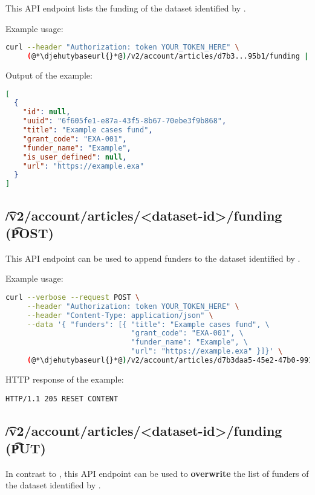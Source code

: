   This API endpoint lists the funding of the dataset identified by .

  Example usage:
\begin{lstlisting}[language=bash]
curl --header "Authorization: token YOUR_TOKEN_HERE" \
     (@*\djehutybaseurl{}*@)/v2/account/articles/d7b3...95b1/funding | jq
\end{lstlisting}

  Output of the example:
\begin{lstlisting}[language=JSON]
[
  {
    "id": null,
    "uuid": "6f605fe1-e87a-43f5-8b67-70ebe3f9b868",
    "title": "Example cases fund",
    "grant_code": "EXA-001",
    "funder_name": "Example",
    "is_user_defined": null,
    "url": "https://example.exa"
  }
]
\end{lstlisting}

\subsection{\t{/v2/account/articles/<dataset-id>/funding} (\t{POST})}
\label{sec:api-v2-articles-funding-post}

  This API endpoint can be used to append funders to the dataset identified
  by \code{dataset-id}.

  Example usage:
\begin{lstlisting}[language=bash]
curl --verbose --request POST \
     --header "Authorization: token YOUR_TOKEN_HERE" \
     --header "Content-Type: application/json" \
     --data '{ "funders": [{ "title": "Example cases fund", \
                             "grant_code": "EXA-001", \
                             "funder_name": "Example", \
                             "url": "https://example.exa" }]}' \
     (@*\djehutybaseurl{}*@)/v2/account/articles/d7b3daa5-45e2-47b0-9910-0f7fa6a995b1/funding
\end{lstlisting}

  HTTP response of the example:
\begin{lstlisting}
HTTP/1.1 205 RESET CONTENT
\end{lstlisting}

\subsection{\t{/v2/account/articles/<dataset-id>/funding} (\t{PUT})}

  In contrast to , this API endpoint
  can be used to \textbf{overwrite} the list of funders of the dataset
  identified by .

